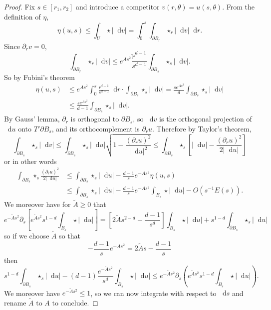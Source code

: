 \documentclass[reqno,11pt]{amsart}
\newcommand*\dif{\mathop{}\!\mathrm{d}}
\theoremstyle{definition}
\numberwithin{equation}{section}
\begin{document}
\begin{proof}
Fix $s \in [r_1, r_2]$ and introduce a competitor $v(r, \theta) = u(s, \theta)$.
From the definition of $\eta$,
$$\eta(u, s) \leq \int_U \star |\dif v| = \int_0^s \int_{\partial B_r} \star_r |\dif v| \dif r.$$
Since $\partial_r v = 0$,
$$\int_{\partial B_r} \star_r |\dif v| \leq e^{As^2} \frac{\tilde r^{d - 1}}{s^{d - 1}} \int_{\partial B_s} \star_s |\dif v|.$$
So by Fubini's theorem
\begin{align*}
\eta(u, s) &\leq e^{As^2} \int_0^s \frac{r^{d - 1}}{s^{d - 1}} \dif r \cdot \int_{\partial B_s} \star_s |\dif v| = \frac{s e^{As^2}}{d} \int_{\partial B_s} \star_s |\dif v|\\
&\leq \frac{s e^{As^2}}{d - 1} \int_{\partial B_s} \star_s |\dif v|.
\end{align*}
By Gauss' lemma, $\partial_r$ is orthogonal to $\partial B_s$, so $\dif v$ is the orthogonal projection of $\dif u$ onto $T' \partial B_s$, and its orthocomplement is $\partial_r u$. Therefore by Taylor's theorem,
$$\int_{\partial B_s} \star_s |\dif v| \leq \int_{\partial B_s} \star_s |\dif u| \sqrt{1 - \frac{(\partial_r u)^2}{|\dif u|^2}} \leq \int_{\partial B_s} \star_s \left[|\dif u| - \frac{(\partial_r u)^2}{2 |\dif u|}\right]$$
or in other words
\begin{align*}
\int_{\partial B_s} \star_s \frac{(\partial_r u)^2}{2|\dif u|} &\leq \int_{\partial B_s} \star_s |\dif u| - \frac{d - 1}{s} e^{-As^2} \eta(u, s)\\
&\leq \int_{\partial B_s} \star_s |\dif u| - \frac{d - 1}{s} e^{-As^2} \int_{B_s} \star |\dif u| - O(s^{-1}E(s)).
\end{align*}
We moreover have for $\tilde A \geq 0$ that
$$e^{-\tilde As^2} \partial_s \left[e^{\tilde As^2} s^{1 - d} \int_{B_s} \star |\dif u|\right] = \left[2\tilde As^{2 - d} - \frac{d - 1}{s^d}\right]\int_{B_s} \star |\dif u| + s^{1 - d} \int_{\partial B_s} \star_s |\dif u|$$
so if we choose $\tilde A$ so that
$$-\frac{d - 1}{s} e^{-As^2} = 2\tilde As - \frac{d - 1}{s}$$
then
$$s^{1 - d} \int_{\partial B_s} \star_s |\dif u| - (d - 1)\frac{e^{-\tilde As^2}}{s^d} \int_{B_s} \star|\dif u| \leq e^{-\tilde As^2} \partial_s\left(e^{\tilde As^2} s^{1 - d} \int_{B_s} \star|\dif u|\right).$$
We moreover have $e^{-\tilde As^2} \leq 1$, so we can now integrate with respect to $\dif s$ and rename $\tilde A$ to $A$ to conclude.
\end{proof}
\end{document}
